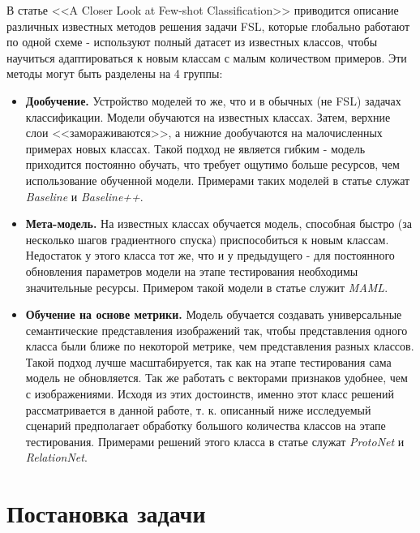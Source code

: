 \documentclass[a4paper, 12pt]{report}
\begin{document}
В статье <<A Closer Look at Few-shot Classification>> \cite{closerlook} приводится описание различных известных методов решения задачи FSL, которые глобально работают по одной схеме - используют полный датасет из известных классов, чтобы научиться адаптироваться к новым классам с малым количеством примеров. Эти методы могут быть разделены на 4 группы:

\begin{itemize}
\item \textbf{Дообучение.} Устройство моделей то же, что и в обычных (не FSL) задачах классификации. Модели обучаются на известных классах. Затем, верхние слои <<замораживаются>>, а нижние дообучаются на малочисленных примерах новых классах. Такой подход не является гибким - модель приходится постоянно обучать, что требует ощутимо больше ресурсов, чем использование обученной модели. Примерами таких моделей в статье служат \textit{Baseline} и \textit{Baseline++}.

\item \textbf{Мета-модель.} На известных классах обучается модель, способная быстро (за несколько шагов градиентного спуска) приспособиться к новым классам. Недостаток у этого класса тот же, что и у предыдущего - для постоянного обновления параметров модели на этапе тестирования необходимы значительные ресурсы. Примером такой модели в статье служит \textit{MAML}.

\item \textbf{Обучение на основе метрики.} Модель обучается создавать универсальные семантические представления изображений так, чтобы представления одного класса были ближе по некоторой метрике, чем представления разных классов. Такой подход лучше масштабируется, так как на этапе тестирования сама модель не обновляется. Так же работать с векторами признаков удобнее, чем с изображениями. Исходя из этих достоинств, именно этот класс решений рассматривается в данной работе, т. к. описанный ниже исследуемый сценарий предполагает обработку большого количества классов на этапе тестирования. Примерами решений этого класса в статье служат \textit{ProtoNet} и \textit{RelationNet}.


\end{itemize}

\chapter{Постановка задачи}
\end{document}
